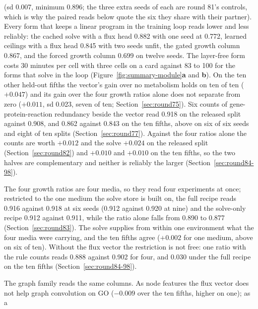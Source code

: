 \begin{description}
    (sd 0.007, minimum 0.896; the three extra seeds of each are round 81's controls,
    which is why the paired reads below quote the six they share with their partner). Every form that keeps a linear program in the training
    loop reads lower and less reliably: the cached solve with a flux head 0.882 with one
    seed at 0.772, learned ceilings with a flux head 0.845 with two seeds unfit, the
    gated growth column 0.867, and the forced growth column 0.699 on twelve seeds. The
    layer-free form costs 30 minutes per cell with three cells on a card against 83 to
    100 for the forms that solve in the loop
    (Figure~\ref{fig:summary-module}\textbf{a} and \textbf{b}). On the ten other held-out
    fifths the vector's gain over no metabolism holds on ten of ten ($+0.047$) and its
    gain over the four growth ratios alone does not separate from zero ($+0.011$, sd
    0.023, seven of ten; Section~\ref{sec:round75}). Six counts of
    gene-protein-reaction redundancy beside the vector read 0.918 on the released split
    against 0.908, and 0.862 against 0.843 on the ten fifths, above on six of six seeds
    and eight of ten splits (Section~\ref{sec:round77}). Against the four ratios alone
    the counts are worth $+0.012$ and the solve $+0.024$ on the released split
    (Section~\ref{sec:round82}) and $+0.010$ and $+0.010$ on the ten fifths, so the two
    halves are complementary and neither is reliably the larger
    (Section~\ref{sec:round84-98}).
  \item[Every metabolic column fits inside one experiment.] The four growth ratios are
    four media, so they read four experiments at once; restricted to the one medium the
    solve store is built on, the full recipe reads 0.916 against 0.918 at six seeds (0.912 against 0.920 at nine) and the solve-only
    recipe 0.912 against 0.911, while the ratio alone falls from 0.890 to 0.877
    (Section~\ref{sec:round83}). The solve supplies from within one environment what the
    four media were carrying, and the ten fifths agree ($+0.002$ for one medium, above
    on six of ten). Without the flux vector the restriction is not free: one ratio with the
    rule counts reads 0.888 against 0.902 for four, and 0.030 under the full recipe on
    the ten fifths (Section~\ref{sec:round84-98}).
  \item[The interface is an affine on the logit, and it carries across model families.]
    The graph family reads the same columns. As node features the flux vector does not
    help graph convolution on GO ($-0.009$ over the ten fifths, higher on one); as a

\end{description}
